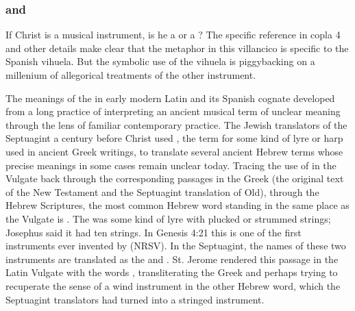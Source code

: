 
\subsubsection{ and }

If Christ is a musical instrument, is he a  or a ?  
The specific reference in copla 4 and other details make clear that the
metaphor in this villancico is specific to the Spanish 
vihuela.
But the symbolic use of the vihuela is piggybacking on a millenium of
allegorical treatments of the other instrument.

The meanings of the  in early modern Latin and its Spanish
cognate  developed from a long practice of interpreting an ancient
musical term of unclear meaning through the lens of familiar contemporary
practice.
The Jewish translators of the Septuagint a century before Christ used
, the term for some kind of lyre or harp used in ancient Greek
writings, to translate several ancient Hebrew terms whose precise meanings in
some cases remain unclear today.%
    \Autocite{Lawergren:Lyres}
Tracing the use of  in the Vulgate back through the corresponding
passages in the Greek (the original text of the New Testament and the
Septuagint translation of Old), through the Hebrew Scriptures, the most common
Hebrew word standing in the same place as the Vulgate  is
.
The  was some kind of lyre with plucked or strummed strings;
Josephus said it had ten strings.%
    \Autocite[]{Bromily:BibleEncyclopedia}
In Genesis 4:21 this is one of the first instruments ever invented by
 (NRSV).
In the Septuagint, the names of these two instruments are translated as the
 and .
St. Jerome rendered this passage in the Latin Vulgate with the words
, transliterating the Greek  and
perhaps trying to recuperate the sense of a wind instrument in the other Hebrew
word, which the Septuagint translators had turned into a stringed instrument.


